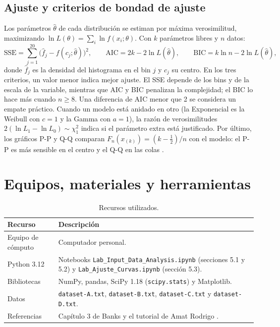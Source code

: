 \documentclass[11pt,a4paper]{article}
\begin{document}
\subsection{Ajuste y criterios de bondad de ajuste}
Los parámetros $\hat\theta$ de cada distribución se estiman por máxima verosimilitud,
maximizando $\ln L(\theta)=\sum_i\ln f(x_i;\theta)$. Con $k$ parámetros libres y $n$ datos:
\begin{equation}
 \text{SSE}=\sum_{j=1}^{20}\bigl(\hat f_j-f(c_j;\hat\theta)\bigr)^2,\qquad
 \text{AIC}=2k-2\ln L(\hat\theta),\qquad \text{BIC}=k\ln n-2\ln L(\hat\theta),
\end{equation}
donde $\hat f_j$ es la densidad del histograma en el bin $j$ y $c_j$ su centro. En los tres
criterios, un valor menor indica mejor ajuste. El SSE depende de los bins y de la escala de la
variable, mientras que AIC y BIC penalizan la complejidad; el BIC lo hace más cuando $n\ge8$.
Una diferencia de AIC menor que 2 se considera un empate práctico. Cuando un modelo está anidado en
otro (la Exponencial es la Weibull con $c=1$ y la Gamma con $a=1$), la razón de verosimilitudes
$2(\ln L_1-\ln L_0)\sim\chi^2_1$ indica si el parámetro extra está justificado. Por último, los
gráficos P-P y Q-Q comparan $F_n(x_{(k)})=(k-\frac12)/n$ con el modelo: el P-P es más sensible en
el centro y el Q-Q en las colas \cite[Sec.~3.5]{banks1998}.

\section{Equipos, materiales y herramientas}
\begin{table}[H]\centering
\caption{Recursos utilizados.}
\begin{tabular}{p{}p{}}\toprule
\textbf{Recurso}&\textbf{Descripción}\\\midrule
Equipo de cómputo&Computador personal.\\
Python 3.12&Notebooks \texttt{Lab\_Input\_Data\_Analysis.ipynb} (secciones 5.1 y 5.2) y
\texttt{Lab\_Ajuste\_Curvas.ipynb} (sección 5.3).\\
Bibliotecas&NumPy, pandas, SciPy 1.18 (\texttt{scipy.stats}) \cite{scipy} y Matplotlib.\\
Datos&\texttt{dataset-A.txt}, \texttt{dataset-B.txt}, \texttt{dataset-C.txt} y \texttt{dataset-D.txt}.\\
Referencias&Capítulo 3 de Banks \cite{banks1998} y el tutorial de Amat Rodrigo \cite{amat2021}.\\\bottomrule
\end{tabular}\end{table}
\end{document}
